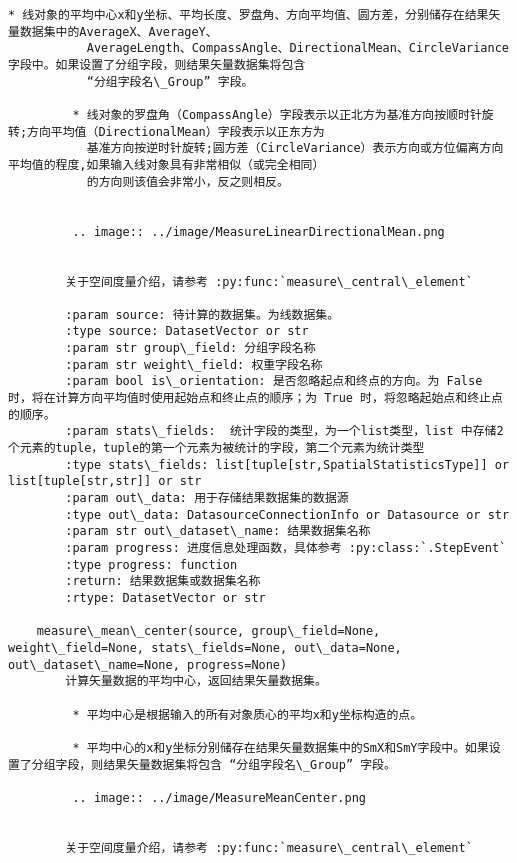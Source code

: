 \documentclass[11pt]{article}
\begin{document}
\begin{Verbatim}[commandchars=\\\{\}]
         * 线对象的平均中心x和y坐标、平均长度、罗盘角、方向平均值、圆方差，分别储存在结果矢量数据集中的AverageX、AverageY、
           AverageLength、CompassAngle、DirectionalMean、CircleVariance字段中。如果设置了分组字段，则结果矢量数据集将包含
           “分组字段名\_Group” 字段。
        
         * 线对象的罗盘角（CompassAngle）字段表示以正北方为基准方向按顺时针旋转;方向平均值（DirectionalMean）字段表示以正东方为
           基准方向按逆时针旋转;圆方差（CircleVariance）表示方向或方位偏离方向平均值的程度,如果输入线对象具有非常相似（或完全相同）
           的方向则该值会非常小，反之则相反。
        
        
         .. image:: ../image/MeasureLinearDirectionalMean.png
        
        
        关于空间度量介绍，请参考 :py:func:`measure\_central\_element`
        
        :param source: 待计算的数据集。为线数据集。
        :type source: DatasetVector or str
        :param str group\_field: 分组字段名称
        :param str weight\_field: 权重字段名称
        :param bool is\_orientation: 是否忽略起点和终点的方向。为 False 时，将在计算方向平均值时使用起始点和终止点的顺序；为 True 时，将忽略起始点和终止点的顺序。
        :param stats\_fields:  统计字段的类型，为一个list类型，list 中存储2个元素的tuple，tuple的第一个元素为被统计的字段，第二个元素为统计类型
        :type stats\_fields: list[tuple[str,SpatialStatisticsType]] or list[tuple[str,str]] or str
        :param out\_data: 用于存储结果数据集的数据源
        :type out\_data: DatasourceConnectionInfo or Datasource or str
        :param str out\_dataset\_name: 结果数据集名称
        :param progress: 进度信息处理函数，具体参考 :py:class:`.StepEvent`
        :type progress: function
        :return: 结果数据集或数据集名称
        :rtype: DatasetVector or str
    
    measure\_mean\_center(source, group\_field=None, weight\_field=None, stats\_fields=None, out\_data=None, out\_dataset\_name=None, progress=None)
        计算矢量数据的平均中心，返回结果矢量数据集。
        
         * 平均中心是根据输入的所有对象质心的平均x和y坐标构造的点。
        
         * 平均中心的x和y坐标分别储存在结果矢量数据集中的SmX和SmY字段中。如果设置了分组字段，则结果矢量数据集将包含 “分组字段名\_Group” 字段。
        
         .. image:: ../image/MeasureMeanCenter.png
        
        
        关于空间度量介绍，请参考 :py:func:`measure\_central\_element`
        

\end{Verbatim}
\end{document}
